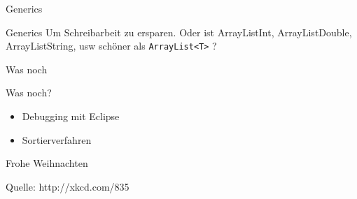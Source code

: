 \documentclass[18pt]{beamer}
\begin{document}
\begin{section}{Generics} 
\begin{frame}[fragile]{Generics}
 Um Schreibarbeit zu ersparen.
 Oder ist ArrayListInt, ArrayListDouble, ArrayListString, usw schöner als \verb|ArrayList<T>| ?
\end{frame}
\end{section}



\begin{section}{Was noch} 
\begin{frame}{Was noch?}
\begin{itemize}
 \item Debugging mit Eclipse
 \item Sortierverfahren
\end{itemize}
 
\end{frame}
\end{section}



\begin{frame}{Frohe Weihnachten}
 
 Quelle: http://xkcd.com/835
\end{frame}
\end{document}

